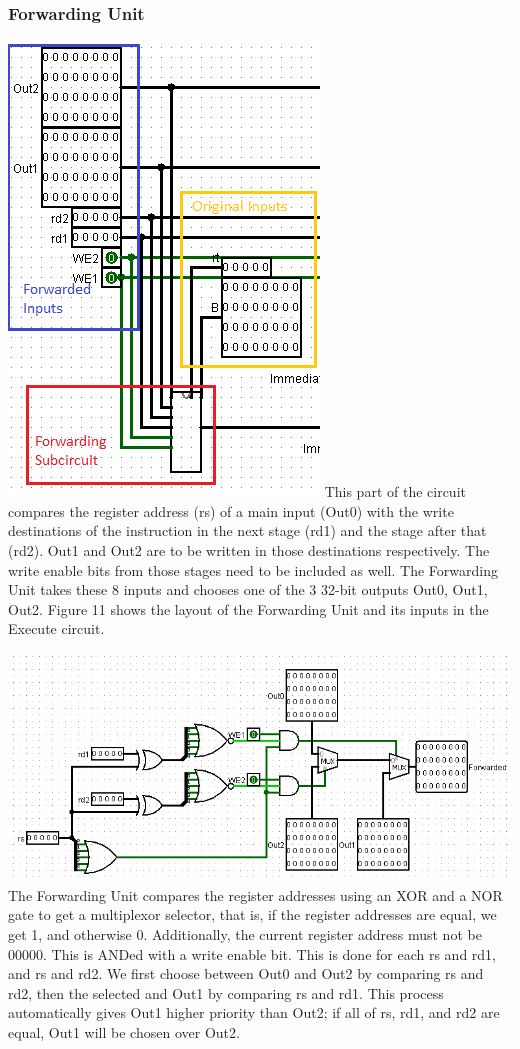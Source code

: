 \documentclass{article}
\begin{document}
\subsubsection{Forwarding Unit}
\includegraphics{Forward1.png}
This part of the circuit compares the register address (rs) of a main input (Out0) with the write destinations of the instruction in the next stage (rd1) and the stage after that (rd2). Out1 and Out2 are to be written in those destinations respectively. The write enable bits from those stages need to be included as well. The Forwarding Unit takes these 8 inputs and chooses one of the 3 32-bit outputs Out0, Out1, Out2. Figure 11 shows the layout of the Forwarding Unit and its inputs in the Execute circuit.

\includegraphics{Forward2.png}
The Forwarding Unit compares the register addresses using an XOR and a NOR gate to get a multiplexor selector, that is, if the register addresses are equal, we get 1, and otherwise 0. Additionally, the current register address must not be 00000. This is ANDed with a write enable bit. This is done for each rs and rd1, and rs and rd2. We first choose between Out0 and Out2 by comparing rs and rd2, then the selected and Out1 by comparing rs and rd1. This process automatically gives Out1 higher priority than Out2; if all of rs, rd1, and rd2 are equal, Out1 will be chosen over Out2. 
\end{document}
